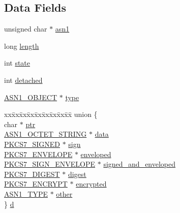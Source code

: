 \subsection*{Data Fields}
\begin{DoxyCompactItemize}
\item 
unsigned char $\ast$ \hyperlink{structpkcs7__st_aeb68d4c115a405d4de8fd360d5871ec9}{asn1}
\item 
long \hyperlink{structpkcs7__st_ae2b29049fcd8b777a54a1529743b2390}{length}
\item 
int \hyperlink{structpkcs7__st_a89f234133d3efe315836311cbf21c64b}{state}
\item 
int \hyperlink{structpkcs7__st_a485cdcdb542bd4408d5f38ebcdfb9579}{detached}
\item 
\hyperlink{crypto_2ossl__typ_8h_ae3fda0801e4c8e250087052bafb3ce2e}{A\+S\+N1\+\_\+\+O\+B\+J\+E\+CT} $\ast$ \hyperlink{structpkcs7__st_a208650820ad37e29d3433d9f20665c28}{type}
\item 
\begin{tabbing}
xx\=xx\=xx\=xx\=xx\=xx\=xx\=xx\=xx\=\kill
union \{\\
\>char $\ast$ \hyperlink{structpkcs7__st_a935adc2e417a61d7eb6f04efb18ba031}{ptr}\\
\>\hyperlink{crypto_2ossl__typ_8h_afbd05e94e0f0430a2b729473efec88c1}{ASN1\_OCTET\_STRING} $\ast$ \hyperlink{structpkcs7__st_ad912ad9a7275eda123accbf6fbdc5daa}{data}\\
\>\hyperlink{crypto_2pkcs7_2pkcs7_8h_ae3e48838b6eec0a566e029e560b8b9d0}{PKCS7\_SIGNED} $\ast$ \hyperlink{structpkcs7__st_a8129d85937f7a208c7940fa6033cfef9}{sign}\\
\>\hyperlink{crypto_2pkcs7_2pkcs7_8h_a1f34be8284ff006103ac91e9c995b817}{PKCS7\_ENVELOPE} $\ast$ \hyperlink{structpkcs7__st_addfc85f45fb2c64da554631a518cb320}{enveloped}\\
\>\hyperlink{crypto_2pkcs7_2pkcs7_8h_a4eb4ff15388b5f4e4d613ceb1c358267}{PKCS7\_SIGN\_ENVELOPE} $\ast$ \hyperlink{structpkcs7__st_a18d91284fe3a47f8f636f5528ac63860}{signed\_and\_enveloped}\\
\>\hyperlink{crypto_2pkcs7_2pkcs7_8h_a73ca53b37fe527bd00bb844b49a54e85}{PKCS7\_DIGEST} $\ast$ \hyperlink{structpkcs7__st_a2ad38484eb9edc690b070d231e2fba03}{digest}\\
\>\hyperlink{crypto_2pkcs7_2pkcs7_8h_a313da3bf0273fe0a578dffa29bc39a22}{PKCS7\_ENCRYPT} $\ast$ \hyperlink{structpkcs7__st_acf84e632e795c7da4eceee41e7e83cb5}{encrypted}\\
\>\hyperlink{crypto_2asn1_2asn1_8h_a7895e03d9fee2bc4963faf2a31a9439e}{ASN1\_TYPE} $\ast$ \hyperlink{structpkcs7__st_a913b5f8be6ebbc8d847d25c9279ee3d2}{other}\\
\} \hyperlink{structpkcs7__st_a6df8107bfb152de565203c8cbf5d56e8}{d}\\


\end{tabbing}
\end{DoxyCompactItemize}
